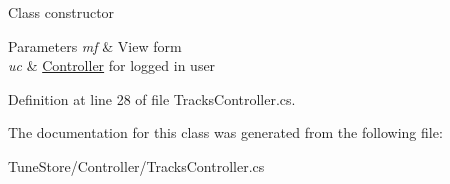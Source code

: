 Class constructor 


\begin{DoxyParams}{Parameters}
{\em mf} & View form\\
\hline
{\em uc} & \hyperlink{namespace_tune_store_1_1_controller}{Controller} for logged in user\\
\hline
\end{DoxyParams}


Definition at line 28 of file Tracks\+Controller.\+cs.



The documentation for this class was generated from the following file\+:\begin{DoxyCompactItemize}
\item 
Tune\+Store/\+Controller/Tracks\+Controller.\+cs\end{DoxyCompactItemize}

